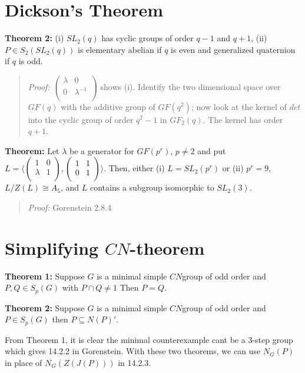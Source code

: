 \section{Dickson's Theorem}
{\bf Theorem 2:} (i) $SL_2(q)$ has cyclic groups of order $q-1$ and $q+1$, (ii) $P \in S_2(SL_2(q))$ is
elementary abelian if $q$ is even and generalized quaternion if $q$ is odd.
\begin{quote}
\emph{Proof:}
$ \left(
\begin{array}{cc}
\lambda  &  0 \\
0 &  {\lambda}^{-1} \\
\end{array}
\right)$ shows (i). Identify the two dimensional space over $GF(q)$ with the additive group of $GF(q^2)$;
now look at the kernel of $det$ into the cyclic group of order $q^2-1$ in $GF_2(q)$.  The kernel has order $q+1$.
\end{quote}
{\bf Theorem:} Let $\lambda$ be a generator for $GF(p^r )$, $p \ne 2$ and put
$L= \langle
\left(
\begin{array}{cc}
1 &  0 \\
\lambda &  1 \\
\end{array}
\right),
\left(
\begin{array}{cc}
1 &  1\\
0 &  1\\
\end{array}
\right)
\rangle$. Then, either (i) $L=SL_2(p^r)$ or (ii) $p^r=9$, $L/Z(L) \cong A_5$, and
$L$ contains a subgroup isomorphic to $SL_2(3)$.
\begin{quote}
\emph{Proof:}
Gorenstein 2.8.4
\end{quote}
\section{Simplifying $CN$-theorem}
{\bf Theorem 1:} Suppose $G$ is a minimal simple $CN$group of odd order and $P, Q \in S_p(G)$ with
$P \cap Q \ne 1$  Then $P=Q$.
\begin{quote}
\end{quote}
{\bf Theorem 2:} Suppose $G$ is a minimal simple $CN$group of odd order and $P \in S_p(G)$ then
$P \subseteq N(P)'$.
\begin{quote}
\end{quote}
From Theorem 1, it is clear the minimal counterexample cant be a $3$-step group which gives 14.2.2 in Gorenstein.  With these two theorems, we can use $N_G(P)$ in place of $N_G(Z(J(P)))$ in 14.2.3.
